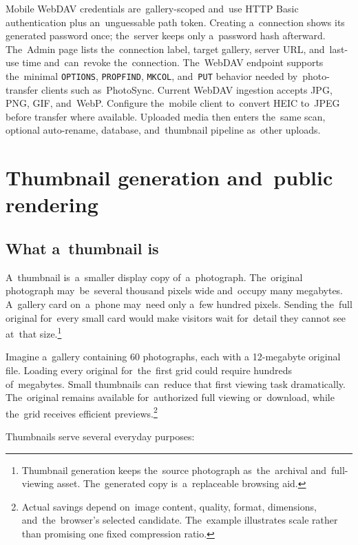 \documentclass[11pt,a4paper]{article}
\newcommand{\codeword}[1]{\nolinkurl{#1}}
\begin{document}
Mobile WebDAV credentials are~gallery-scoped and~use HTTP Basic authentication
plus an~unguessable path token. Creating a~connection shows its generated
password once; the~server keeps only a~password hash afterward. The~Admin page
lists the~connection label, target gallery, server URL, and~last-use time
and~can~revoke the~connection. The~WebDAV endpoint supports the~minimal
\codeword{OPTIONS}, \codeword{PROPFIND}, \codeword{MKCOL}, and~\codeword{PUT}
behavior needed by~photo-transfer clients such as~PhotoSync. Current WebDAV
ingestion accepts JPG, PNG, GIF, and~WebP. Configure the~mobile client
to~convert HEIC to~JPEG before transfer where available. Uploaded media then
enters the~same scan, optional auto-rename, database, and~thumbnail pipeline
as~other uploads.

\section{Thumbnail generation and~public rendering}
\label{sec:thumbnails}

\subsection{What a~thumbnail is}

A~thumbnail is~a~smaller display copy of~a~photograph. The~original photograph
may~be~several thousand pixels wide and~occupy many megabytes. A~gallery card
on~a~phone may~need only a~few hundred pixels. Sending the~full original
for~every small card would make visitors wait for~detail they cannot see at~that
size.\footnote{Thumbnail generation keeps the~source photograph as~the~archival
and~full-viewing asset. The~generated copy is~a~replaceable browsing aid.}

Imagine a~gallery containing 60 photographs, each with a 12-megabyte original
file. Loading every original for~the~first grid could require hundreds
of~megabytes. Small thumbnails can~reduce that first viewing task dramatically.
The~original remains available for~authorized full viewing or~download, while
the~grid receives efficient previews.\footnote{Actual savings depend on~image
content, quality, format, dimensions, and~the~browser's selected candidate.
The~example illustrates scale rather than promising one fixed compression
ratio.}

Thumbnails serve several everyday purposes:
\end{document}
